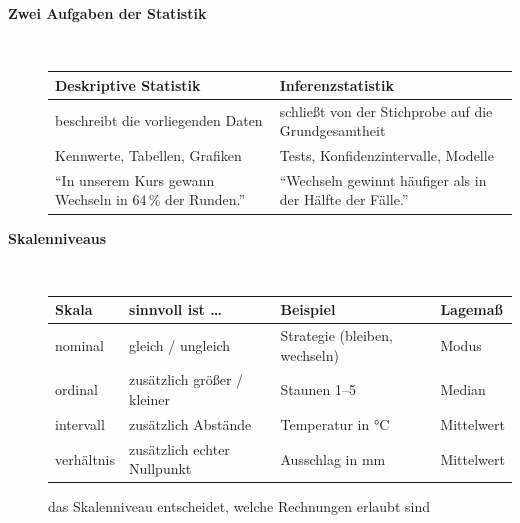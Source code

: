 \begin{description}
\item[{\rot\bf Zwei Aufgaben der Statistik}]~\\[-\lblskip]
\begin{center}
\begin{tabular}{p{}p{}}
\toprule
\textbf{Deskriptive Statistik} & \textbf{Inferenzstatistik} \\
\midrule
beschreibt die vorliegenden Daten & schließt von der Stichprobe auf die Grundgesamtheit \\
Kennwerte, Tabellen, Grafiken & Tests, Konfidenzintervalle, Modelle \\
\enquote{In unserem Kurs gewann Wechseln in 64\,\% der Runden.} & \enquote{Wechseln gewinnt häufiger als in der Hälfte der Fälle.} \\
\bottomrule
\end{tabular}
\end{center}
\os{\newpage}

\item[{\rot\bf Skalenniveaus}]~\\[-\lblskip]
\begin{center}
\small
\begin{tabular}{@{}p{}p{}p{}p{}@{}}
\toprule
\textbf{Skala} & \textbf{sinnvoll ist \dots} & \textbf{Beispiel} & \textbf{Lagemaß} \\
\midrule
nominal & gleich / ungleich & Strategie (bleiben, wechseln) & Modus \\
ordinal & zusätzlich größer / kleiner & Staunen 1--5 & Median \\
intervall & zusätzlich Abstände & Temperatur in °C & Mittelwert \\
verhältnis & zusätzlich echter Nullpunkt & Ausschlag in mm & Mittelwert \\
\bottomrule
\end{tabular}
\end{center}
\bi
  \ite das Skalenniveau entscheidet, welche Rechnungen erlaubt sind
\ei
{}
\os{\newpage}
\end{description}


